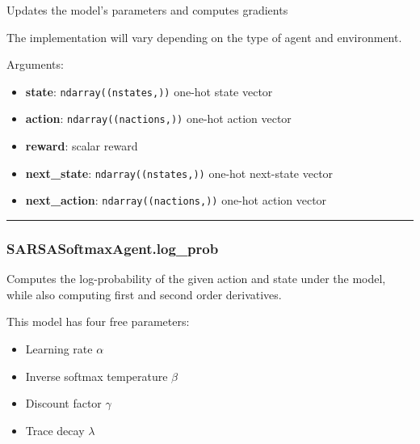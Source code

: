 \begin{Shaded}
\begin{Highlighting}[]
\end{Highlighting}
\end{Shaded}

Updates the model's parameters and computes gradients

The implementation will vary depending on the type of agent and
environment.

Arguments:

\begin{itemize}
\tightlist
\item
  \textbf{state}: \texttt{ndarray((nstates,))} one-hot state vector
\item
  \textbf{action}: \texttt{ndarray((nactions,))} one-hot action vector
\item
  \textbf{reward}: scalar reward
\item
  \textbf{next\_state}: \texttt{ndarray((nstates,))} one-hot next-state
  vector
\item
  \textbf{next\_action}: \texttt{ndarray((nactions,))} one-hot action
  vector
\end{itemize}

\begin{center}\rule{0.5\linewidth}{\linethickness}\end{center}

\subsubsection{SARSASoftmaxAgent.log\_prob}\label{sarsasoftmaxagent.log_prob}

\begin{Shaded}
\begin{Highlighting}[]
\end{Highlighting}
\end{Shaded}

Computes the log-probability of the given action and state under the
model, while also computing first and second order derivatives.

This model has four free parameters:

\begin{itemize}
\tightlist
\item
  Learning rate \(\alpha\)
\item
  Inverse softmax temperature \(\beta\)
\item
  Discount factor \(\gamma\)
\item
  Trace decay \(\lambda\)
\end{itemize}

